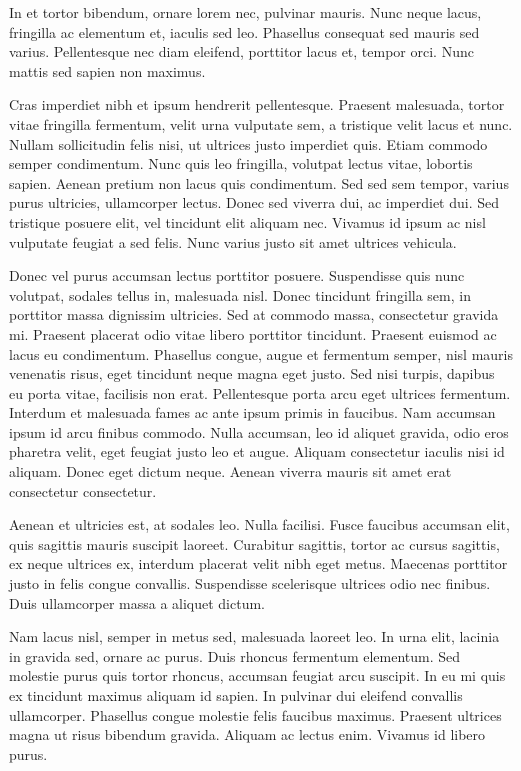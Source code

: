 \documentclass[10pt,openany]{book}
\begin{document}
In et tortor bibendum, ornare lorem nec, pulvinar mauris. Nunc neque lacus,
fringilla ac elementum et, iaculis sed leo. Phasellus consequat sed mauris sed
varius. Pellentesque nec diam eleifend, porttitor lacus et, tempor orci. Nunc
mattis sed sapien non maximus.

Cras imperdiet nibh et ipsum hendrerit pellentesque. Praesent malesuada, tortor
vitae fringilla fermentum, velit urna vulputate sem, a tristique velit lacus et
nunc. Nullam sollicitudin felis nisi, ut ultrices justo imperdiet quis. Etiam
commodo semper condimentum. Nunc quis leo fringilla, volutpat lectus vitae,
lobortis sapien. Aenean pretium non lacus quis condimentum. Sed sed sem tempor,
varius purus ultricies, ullamcorper lectus. Donec sed viverra dui, ac imperdiet
dui. Sed tristique posuere elit, vel tincidunt elit aliquam nec. Vivamus id
ipsum ac nisl vulputate feugiat a sed felis. Nunc varius justo sit amet
ultrices vehicula.

Donec vel purus accumsan lectus porttitor posuere. Suspendisse quis nunc
volutpat, sodales tellus in, malesuada nisl. Donec tincidunt fringilla sem, in
porttitor massa dignissim ultricies. Sed at commodo massa, consectetur gravida
mi. Praesent placerat odio vitae libero porttitor tincidunt. Praesent euismod
ac lacus eu condimentum. Phasellus congue, augue et fermentum semper, nisl
mauris venenatis risus, eget tincidunt neque magna eget justo. Sed nisi turpis,
dapibus eu porta vitae, facilisis non erat. Pellentesque porta arcu eget
ultrices fermentum. Interdum et malesuada fames ac ante ipsum primis in
faucibus. Nam accumsan ipsum id arcu finibus commodo. Nulla accumsan, leo id
aliquet gravida, odio eros pharetra velit, eget feugiat justo leo et augue.
Aliquam consectetur iaculis nisi id aliquam. Donec eget dictum neque. Aenean
viverra mauris sit amet erat consectetur consectetur.

Aenean et ultricies est, at sodales leo. Nulla facilisi. Fusce faucibus
accumsan elit, quis sagittis mauris suscipit laoreet. Curabitur sagittis,
tortor ac cursus sagittis, ex neque ultrices ex, interdum placerat velit nibh
eget metus. Maecenas porttitor justo in felis congue convallis. Suspendisse
scelerisque ultrices odio nec finibus. Duis ullamcorper massa a aliquet dictum.

Nam lacus nisl, semper in metus sed, malesuada laoreet leo. In urna elit,
lacinia in gravida sed, ornare ac purus. Duis rhoncus fermentum elementum. Sed
molestie purus quis tortor rhoncus, accumsan feugiat arcu suscipit. In eu mi
quis ex tincidunt maximus aliquam id sapien. In pulvinar dui eleifend convallis
ullamcorper. Phasellus congue molestie felis faucibus maximus. Praesent
ultrices magna ut risus bibendum gravida. Aliquam ac lectus enim. Vivamus id
libero purus.
\end{document}
